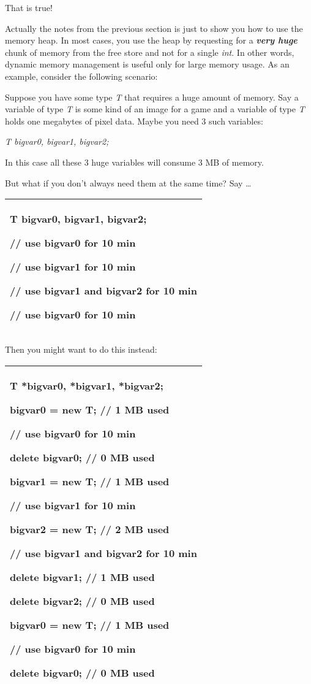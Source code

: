 \documentclass[
]{article}
\begin{document}
That is true!

Actually the notes from the previous section is just to show you how to
use the memory heap. In most cases, you use the heap by requesting for a
\emph{\textbf{very huge}} chunk of memory from the free store and not
for a single \emph{int}. In other words, dynamic memory management is
useful only for large memory usage. As an example, consider the
following scenario:

Suppose you have some type \emph{T} that requires a huge amount of
memory. Say a variable of type \emph{T} is some kind of an image for a
game and a variable of type \emph{T} holds one megabytes of pixel data.
Maybe you need 3 such variables:

\emph{T bigvar0, bigvar1, bigvar2;}

In this case all these 3 huge variables will consume 3 MB of memory.

But what if you don't always need them at the same time? Say \ldots{}

\begin{longtable}[]{@{}l@{}}
\toprule
\endhead
\begin{minipage}[t]{0.97\columnwidth}\raggedright
T bigvar0, bigvar1, bigvar2;

// use bigvar0 for 10 min

// use bigvar1 for 10 min

// use bigvar1 and bigvar2 for 10 min

// use bigvar0 for 10 min \strut
\end{minipage}\tabularnewline
\bottomrule
\end{longtable}

Then you might want to do this instead:

\begin{longtable}[]{@{}l@{}}
\toprule
\endhead
\begin{minipage}[t]{0.97\columnwidth}\raggedright
T *bigvar0, *bigvar1, *bigvar2;

bigvar0 = new T; // 1 MB used

// use bigvar0 for 10 min

delete bigvar0; // 0 MB used

bigvar1 = new T; // 1 MB used

// use bigvar1 for 10 min

bigvar2 = new T; // 2 MB used

// use bigvar1 and bigvar2 for 10 min

delete bigvar1; // 1 MB used

delete bigvar2; // 0 MB used

bigvar0 = new T; // 1 MB used

// use bigvar0 for 10 min

delete bigvar0; // 0 MB used\strut
\end{minipage}\tabularnewline
\bottomrule
\end{longtable}
\end{document}
